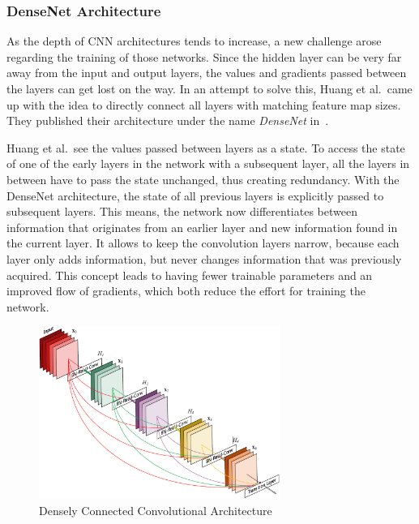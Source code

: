 \subsubsection{DenseNet Architecture}
\label{sec:densenet}
As the depth of CNN architectures tends to increase, a new challenge arose regarding the training of those networks. Since the hidden layer can be very far away from the input and output layers, the values and gradients passed between the layers can get lost on the way. In an attempt to solve this, Huang et al.\ came up with the idea to directly connect all layers with matching feature map sizes. They published their architecture under the name \emph{DenseNet} in~\cite{densenet18}.

Huang et al.\ see the values passed between layers as a state. To access the state of one of the early layers in the network with a subsequent layer, all the layers in between have to pass the state unchanged, thus creating redundancy. With the DenseNet architecture, the state of all previous layers is explicitly passed to subsequent layers. This means, the network now differentiates between information that originates from an earlier layer and new information found in the current layer. It allows to keep the convolution layers narrow, because each layer only adds information, but never changes information that was previously acquired. This concept leads to having fewer trainable parameters and an improved flow of gradients, which both reduce the effort for training the network.~\cite{densenet18}

\begin{figure}[h]
    \centering
    \includegraphics[width=0.7\textwidth]{images/dense-net-architecture}
    \caption{Densely Connected Convolutional Architecture~\cite{densenet18}}
    \label{fig:densenet_architecture}
\end{figure}

